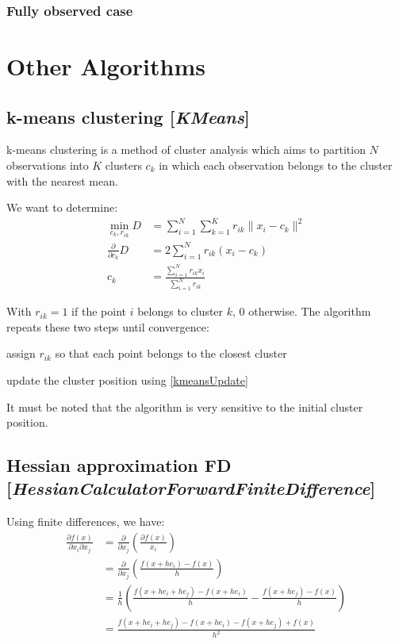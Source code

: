 \documentclass[11pt]{article}
\newcommand{\nllref}[1]{[\small{\textit{#1}}]}
\newcommand{\norm}[1]{\| #1 \|}
\begin{document}
\subsubsection{Fully observed case}

\section{Other Algorithms}
\subsection{k-means clustering \nllref{KMeans}}
k-means clustering is a method of cluster analysis which aims to partition $N$ observations into $K$ clusters $c_k$ in which each observation belongs to the cluster with the nearest mean.

We want to determine:
\begin{align}
\min_{c_k,r_{ik}} D &= \sum_{i=1}^N\sum_{k=1}^K r_{ik} \norm{x_i-c_k}^2\nonumber\\
\frac{\partial}{\partial c_k}D &= 2 \sum_{i=1}^Nr_{ik}(x_i-c_k) \nonumber\\
c_k &= \frac{\sum_{i=1}^N r_{ik}x_i}{\sum_{i=1}^N r_{ik}} \label{kmeansUpdate}
\end{align}

With $r_{ik}=1$ if the point $i$ belongs to cluster $k$, 0 otherwise. The algorithm repeats these two steps until convergence:
\begin{compactitem}
\item assign $r_{ik}$ so that each point belongs to the closest cluster
\item update the cluster position using \ref{kmeansUpdate}
\end{compactitem}
It must be noted that the algorithm is very sensitive to the initial cluster position.
\subsection{Hessian approximation FD \nllref{HessianCalculatorForwardFiniteDifference}}
Using finite differences, we have:
\begin{align}
\frac{\partial f(x)}{\partial x_i \partial x_j} &= \frac{\partial}{\partial x_j}( \frac{\partial f(x)}{x_i}) \nonumber\\
&= \frac{\partial}{\partial x_j}( \frac{f(x + he_i) - f(x)}{h} ) \nonumber\\
&= \frac{1}{h}( \frac{f(x + he_i + he_j) - f(x + he_i)}{h} - \frac{f(x + he_j) - f(x)}{h} ) \nonumber\\
&= \frac{f(x + he_i + he_j) - f(x + he_i)-f(x + he_j)+f(x)}{h^2}
\end{align}
\end{document}

